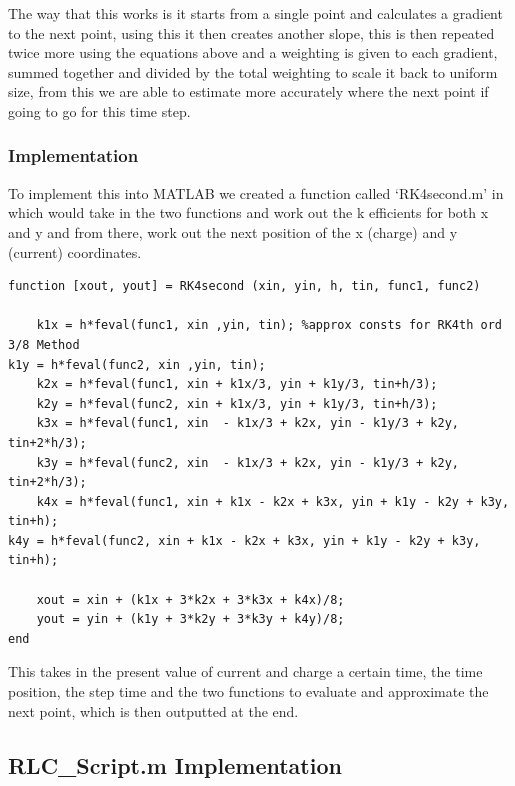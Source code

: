 \documentclass[11pt,a4paper]{article}
\begin{document}
The way that this works is it starts from a single point and calculates a gradient to the next point, using this it then creates another slope, this is then repeated twice more using the equations above and a weighting is given to each gradient, summed together and divided by the total weighting to scale it back to uniform size, from this we are able to estimate more accurately where the next point if going to go for this time step.

\subsubsection{Implementation}

To implement this into MATLAB we created a function called `RK4second.m' in which would take in the two functions and work out the k efficients for both x and y and from there, work out the next position of the x (charge) and y (current) coordinates.

\begin{verbatim}
function [xout, yout] = RK4second (xin, yin, h, tin, func1, func2)

	k1x = h*feval(func1, xin ,yin, tin); %approx consts for RK4th ord 3/8 Method
k1y = h*feval(func2, xin ,yin, tin);
	k2x = h*feval(func1, xin + k1x/3, yin + k1y/3, tin+h/3);
	k2y = h*feval(func2, xin + k1x/3, yin + k1y/3, tin+h/3);
	k3x = h*feval(func1, xin  - k1x/3 + k2x, yin - k1y/3 + k2y, tin+2*h/3);
	k3y = h*feval(func2, xin  - k1x/3 + k2x, yin - k1y/3 + k2y, tin+2*h/3);
	k4x = h*feval(func1, xin + k1x - k2x + k3x, yin + k1y - k2y + k3y, tin+h);
k4y = h*feval(func2, xin + k1x - k2x + k3x, yin + k1y - k2y + k3y, tin+h);

	xout = xin + (k1x + 3*k2x + 3*k3x + k4x)/8;
	yout = yin + (k1y + 3*k2y + 3*k3y + k4y)/8;
end
\end{verbatim}

This takes in the present value of current and charge a certain time, the time position, the step time and the two functions to evaluate and approximate the next point, which is then outputted at the end.

\subsection{RLC\_Script.m Implementation}
\end{document}
